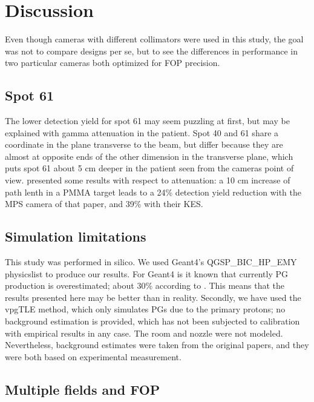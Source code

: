 \documentclass[a4paper,english]{article}
\begin{document}
\section{Discussion}

Even though cameras with different collimators were used in this study, the goal was not to compare designs per se, but to see the differences in performance in two particular cameras both optimized for FOP precision.

\subsection{Spot 61}

The lower detection yield for spot 61 may seem puzzling at first, but may be explained with gamma attenuation in the patient. Spot 40 and 61 share a coordinate in the plane transverse to the beam, but differ because they are almost at opposite ends of the other dimension in the transverse plane, which puts spot 61 about 5 cm deeper in the patient seen from the cameras point of view. \citet[Table 3]{Lin2016} presented some results with respect to attenuation: a 10 cm increase of path lenth in a PMMA target leads to a 24\% detection yield reduction with the MPS camera of that paper, and 39\% with their KES.

\subsection{Simulation limitations}

This study was performed in silico. We used Geant4's QGSP\_BIC\_HP\_EMY physicslist to produce our results. For Geant4 is it known that currently PG production is overestimated; about 30\% according to \cite{Pinto2016}. This means that the results presented here may be better than in reality. Secondly, we have used the vpgTLE method, which only simulates PGs due to the primary protons; no background estimation is provided, which has not been subjected to calibration with empirical results in any case. The room and nozzle were not modeled. Nevertheless, background estimates were taken from the original papers, and they were both based on experimental measurement.

\subsection{Multiple fields and FOP}
\end{document}
